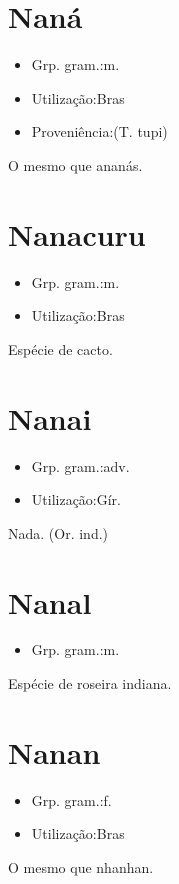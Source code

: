\section{Naná}
\begin{itemize}
\item {Grp. gram.:m.}
\end{itemize}
\begin{itemize}
\item {Utilização:Bras}
\end{itemize}
\begin{itemize}
\item {Proveniência:(T. tupi)}
\end{itemize}
O mesmo que \textunderscore ananás\textunderscore .
\section{Nanacuru}
\begin{itemize}
\item {Grp. gram.:m.}
\end{itemize}
\begin{itemize}
\item {Utilização:Bras}
\end{itemize}
Espécie de cacto.
\section{Nanai}
\begin{itemize}
\item {Grp. gram.:adv.}
\end{itemize}
\begin{itemize}
\item {Utilização:Gír.}
\end{itemize}
Nada.
(Or. ind.)
\section{Nanal}
\begin{itemize}
\item {Grp. gram.:m.}
\end{itemize}
Espécie de roseira indiana.
\section{Nanan}
\begin{itemize}
\item {Grp. gram.:f.}
\end{itemize}
\begin{itemize}
\item {Utilização:Bras}
\end{itemize}
O mesmo que \textunderscore nhanhan\textunderscore .
